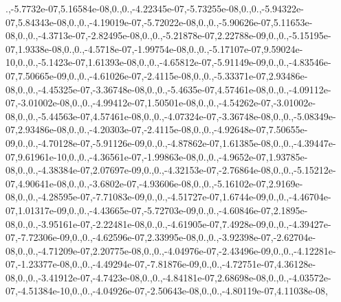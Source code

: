 {.,-\/5.\-7732e-\/07,5.\-16584e-\/08,0.,0.,-\/4.\-22345e-\/07,-\/5.\-73255e-\/08,0.,0.,-\/5.\-94322e-\/07,5.\-84343e-\/08,0.,0.,-\/4.\-19019e-\/07,-\/5.\-72022e-\/08,0.,0.,-\/5.\-90626e-\/07,5.\-11653e-\/08,0.,0.,-\/4.\-3713e-\/07,-\/2.\-82495e-\/08,0.,0.,-\/5.\-21878e-\/07,2.\-22788e-\/09,0.,0.,-\/5.\-15195e-\/07,1.\-9338e-\/08,0.,0.,-\/4.\-5718e-\/07,-\/1.\-99754e-\/08,0.,0.,-\/5.\-17107e-\/07,9.\-59024e-\/10,0.,0.,-\/5.\-1423e-\/07,1.\-61393e-\/08,0.,0.,-\/4.\-65812e-\/07,-\/5.\-91149e-\/09,0.,0.,-\/4.\-83546e-\/07,7.\-50665e-\/09,0.,0.,-\/4.\-61026e-\/07,-\/2.\-4115e-\/08,0.,0.,-\/5.\-33371e-\/07,2.\-93486e-\/08,0.,0.,-\/4.\-45325e-\/07,-\/3.\-36748e-\/08,0.,0.,-\/5.\-4635e-\/07,4.\-57461e-\/08,0.,0.,-\/4.\-09112e-\/07,-\/3.\-01002e-\/08,0.,0.,-\/4.\-99412e-\/07,1.\-50501e-\/08,0.,0.,-\/4.\-54262e-\/07,-\/3.\-01002e-\/08,0.,0.,-\/5.\-44563e-\/07,4.\-57461e-\/08,0.,0.,-\/4.\-07324e-\/07,-\/3.\-36748e-\/08,0.,0.,-\/5.\-08349e-\/07,2.\-93486e-\/08,0.,0.,-\/4.\-20303e-\/07,-\/2.\-4115e-\/08,0.,0.,-\/4.\-92648e-\/07,7.\-50655e-\/09,0.,0.,-\/4.\-70128e-\/07,-\/5.\-91126e-\/09,0.,0.,-\/4.\-87862e-\/07,1.\-61385e-\/08,0.,0.,-\/4.\-39447e-\/07,9.\-61961e-\/10,0.,0.,-\/4.\-36561e-\/07,-\/1.\-99863e-\/08,0.,0.,-\/4.\-9652e-\/07,1.\-93785e-\/08,0.,0.,-\/4.\-38384e-\/07,2.\-07697e-\/09,0.,0.,-\/4.\-32153e-\/07,-\/2.\-76864e-\/08,0.,0.,-\/5.\-15212e-\/07,4.\-90641e-\/08,0.,0.,-\/3.\-6802e-\/07,-\/4.\-93606e-\/08,0.,0.,-\/5.\-16102e-\/07,2.\-9169e-\/08,0.,0.,-\/4.\-28595e-\/07,-\/7.\-71083e-\/09,0.,0.,-\/4.\-51727e-\/07,1.\-6744e-\/09,0.,0.,-\/4.\-46704e-\/07,1.\-01317e-\/09,0.,0.,-\/4.\-43665e-\/07,-\/5.\-72703e-\/09,0.,0.,-\/4.\-60846e-\/07,2.\-1895e-\/08,0.,0.,-\/3.\-95161e-\/07,-\/2.\-22481e-\/08,0.,0.,-\/4.\-61905e-\/07,7.\-4928e-\/09,0.,0.,-\/4.\-39427e-\/07,-\/7.\-72306e-\/09,0.,0.,-\/4.\-62596e-\/07,2.\-33995e-\/08,0.,0.,-\/3.\-92398e-\/07,-\/2.\-62704e-\/08,0.,0.,-\/4.\-71209e-\/07,2.\-20775e-\/08,0.,0.,-\/4.\-04976e-\/07,-\/2.\-43496e-\/09,0.,0.,-\/4.\-12281e-\/07,-\/1.\-23377e-\/08,0.,0.,-\/4.\-49294e-\/07,-\/7.\-81876e-\/09,0.,0.,-\/4.\-72751e-\/07,4.\-36128e-\/08,0.,0.,-\/3.\-41912e-\/07,-\/4.\-7423e-\/08,0.,0.,-\/4.\-84181e-\/07,2.\-68698e-\/08,0.,0.,-\/4.\-03572e-\/07,-\/4.\-51384e-\/10,0.,0.,-\/4.\-04926e-\/07,-\/2.\-50643e-\/08,0.,0.,-\/4.\-80119e-\/07,4.\-11038e-\/08,}
